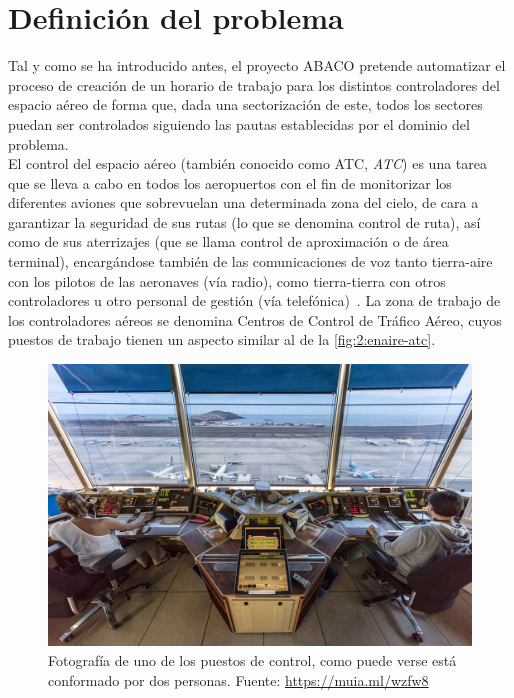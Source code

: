 \graphicspath{{capitulos/Capitulo2-Definicion-del-problema/recursos/}}


\section{Definición del problema} \label{apartado:2}

Tal y como se ha introducido antes, el proyecto ABACO pretende automatizar el proceso de creación de un horario de trabajo para los distintos controladores del espacio aéreo de forma que, dada una sectorización de este, todos los sectores puedan ser controlados siguiendo las pautas establecidas por el dominio del problema.
\\

El control del espacio aéreo (también conocido como \gls{ATC}, \textit{\acrlong{ATC}}) es una tarea que se lleva a cabo en todos los aeropuertos con el fin de monitorizar los diferentes aviones que sobrevuelan una determinada zona del cielo, de cara a garantizar la seguridad de sus rutas (lo que se denomina control de ruta), así como de sus aterrizajes (que se llama control de aproximación o de área terminal), encargándose también de las comunicaciones de voz tanto tierra-aire con los pilotos de las aeronaves (vía radio), como tierra-tierra con otros controladores u otro personal de gestión (vía telefónica)~\cite{ENAIRE-web}.
La zona de trabajo de los controladores aéreos se denomina Centros de Control de Tráfico Aéreo, cuyos puestos de trabajo tienen un aspecto similar al de la \autoref{fig:2:enaire-atc}.

\begin{figure}[htbp]
    \centering
    \includegraphics[width=0.7\linewidth]{ENAIRE-ATC}
    \caption[Fotografía de uno de los puestos de control]{Fotografía de uno de los puestos de control, como puede verse 
    está conformado por dos personas. Fuente: 
    \url{https://muia.ml/wzfw8}}
    \label{fig:2:enaire-atc}
\end{figure}


